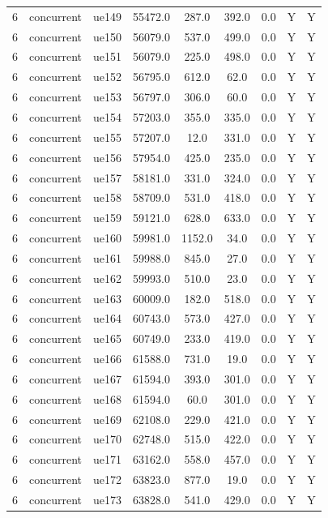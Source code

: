 \begin{table}[ht]
\begin{tabular}{|c|c|c|c|c|c|c|c|c|}
6 & concurrent & ue149 & 55472.0 & 287.0 & 392.0 & 0.0 & Y & Y \\
6 & concurrent & ue150 & 56079.0 & 537.0 & 499.0 & 0.0 & Y & Y \\
6 & concurrent & ue151 & 56079.0 & 225.0 & 498.0 & 0.0 & Y & Y \\
6 & concurrent & ue152 & 56795.0 & 612.0 & 62.0 & 0.0 & Y & Y \\
6 & concurrent & ue153 & 56797.0 & 306.0 & 60.0 & 0.0 & Y & Y \\
6 & concurrent & ue154 & 57203.0 & 355.0 & 335.0 & 0.0 & Y & Y \\
6 & concurrent & ue155 & 57207.0 & 12.0 & 331.0 & 0.0 & Y & Y \\
6 & concurrent & ue156 & 57954.0 & 425.0 & 235.0 & 0.0 & Y & Y \\
6 & concurrent & ue157 & 58181.0 & 331.0 & 324.0 & 0.0 & Y & Y \\
6 & concurrent & ue158 & 58709.0 & 531.0 & 418.0 & 0.0 & Y & Y \\
6 & concurrent & ue159 & 59121.0 & 628.0 & 633.0 & 0.0 & Y & Y \\
6 & concurrent & ue160 & 59981.0 & 1152.0 & 34.0 & 0.0 & Y & Y \\
6 & concurrent & ue161 & 59988.0 & 845.0 & 27.0 & 0.0 & Y & Y \\
6 & concurrent & ue162 & 59993.0 & 510.0 & 23.0 & 0.0 & Y & Y \\
6 & concurrent & ue163 & 60009.0 & 182.0 & 518.0 & 0.0 & Y & Y \\
6 & concurrent & ue164 & 60743.0 & 573.0 & 427.0 & 0.0 & Y & Y \\
6 & concurrent & ue165 & 60749.0 & 233.0 & 419.0 & 0.0 & Y & Y \\
6 & concurrent & ue166 & 61588.0 & 731.0 & 19.0 & 0.0 & Y & Y \\
6 & concurrent & ue167 & 61594.0 & 393.0 & 301.0 & 0.0 & Y & Y \\
6 & concurrent & ue168 & 61594.0 & 60.0 & 301.0 & 0.0 & Y & Y \\
6 & concurrent & ue169 & 62108.0 & 229.0 & 421.0 & 0.0 & Y & Y \\
6 & concurrent & ue170 & 62748.0 & 515.0 & 422.0 & 0.0 & Y & Y \\
6 & concurrent & ue171 & 63162.0 & 558.0 & 457.0 & 0.0 & Y & Y \\
6 & concurrent & ue172 & 63823.0 & 877.0 & 19.0 & 0.0 & Y & Y \\
6 & concurrent & ue173 & 63828.0 & 541.0 & 429.0 & 0.0 & Y & Y \\

\end{tabular}
\end{table}
